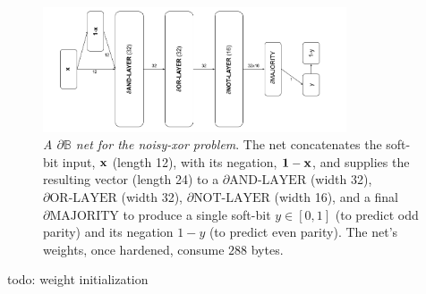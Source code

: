 \documentclass{article} %
\begin{document}
\begin{figure}[h]
	\centering
	\includegraphics[width=0.8\textwidth]{noisy-xor-architecture.png}
	\caption{{\em A $\partial\mathbb{B}$ net for the noisy-xor problem}. The net concatenates the soft-bit input, ${\bf x}$ (length 12), with its negation, ${\bf 1 - x}$, and supplies the resulting vector (length 24) to a $\partial\text{AND-LAYER}$ (width 32), $\partial\text{OR-LAYER}$ (width 32),  $\partial\text{NOT-LAYER}$ (width 16), and a final $\partial\text{MAJORITY}$ to produce a single soft-bit $y \in [0,1]$ (to predict odd parity) and its negation $1-y$ (to predict even parity). The net's weights, once hardened, consume $288$ bytes.}
	\label{fig:noisy-xor-architecture}
\end{figure}


todo: weight initialization
\end{document}
